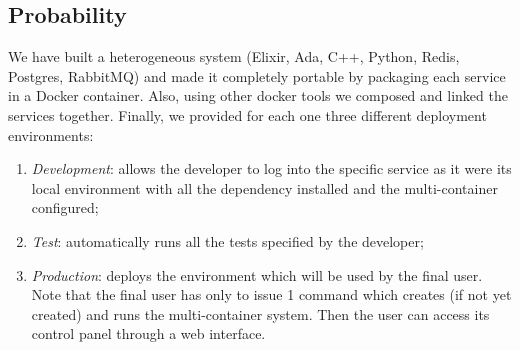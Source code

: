 \subsection{Probability}
We have built a heterogeneous system
(Elixir, Ada, C++, Python, Redis, Postgres, RabbitMQ)
and made it completely portable by packaging each service in a Docker container.
Also, using other docker tools we composed and linked the services together.
Finally, we provided for each one three different deployment environments:
\begin{enumerate}
  \item \textit{Development}: allows the developer to
  log into the specific service as it were its local environment
  with all the dependency installed and the multi-container configured;
  \item \textit{Test}: automatically runs all the tests specified by
  the developer;
  \item \textit{Production}: deploys the environment which will be used by
  the final user. Note that the final user has only to issue 1 command which
  creates (if not yet created) and runs the multi-container system.
  Then the user can access its control panel through a web interface.
\end{enumerate}